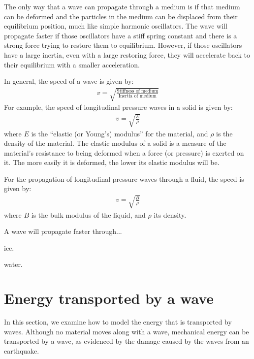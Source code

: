 The only way that a wave can propagate through a medium is if that medium can be deformed and the particles in the medium can be displaced from their equilibrium position, much like simple harmonic oscillators. The wave will propagate faster if those oscillators have a stiff spring constant and there is a strong force trying to restore them to equilibrium. However, if those oscillators have a large inertia, even with a large restoring force, they will accelerate back to their equilibrium with a smaller acceleration. 

In general, the speed of a wave is given by:
\begin{align*}
v=\sqrt{\frac{\text{Stiffness of medium}}{\text{Inertia of medium}}}
\end{align*} 
For example, the speed of longitudinal pressure waves in a solid is given by:
\begin{align*}
v=\sqrt{\frac{E}{\rho}}
\end{align*}
where $E$ is the ``elastic (or Young's) modulus'' for the material, and $\rho$ is the density of the material. The elastic modulus of a solid is a measure of the material's resistance to being deformed when a force (or pressure) is exerted on it. The more easily it is deformed, the lower its elastic modulus will be. 

For the propagation of longitudinal pressure waves through a fluid, the speed is given by:
\begin{align*}
v=\sqrt{\frac{B}{\rho}}
\end{align*}
where $B$ is the bulk modulus of the liquid, and $\rho$ its density. 

\begin{checkpoint}
\begin{MCquestion}{A wave will propagate faster through...}
\item ice.\correct
\item water.
\end{MCquestion}
\end{checkpoint}


\section{Energy transported by a wave}
In this section, we examine how to model the energy that is transported by waves. Although no material moves along with a wave, mechanical energy can be transported by a wave, as evidenced by the damage caused by the waves from an earthquake.  
